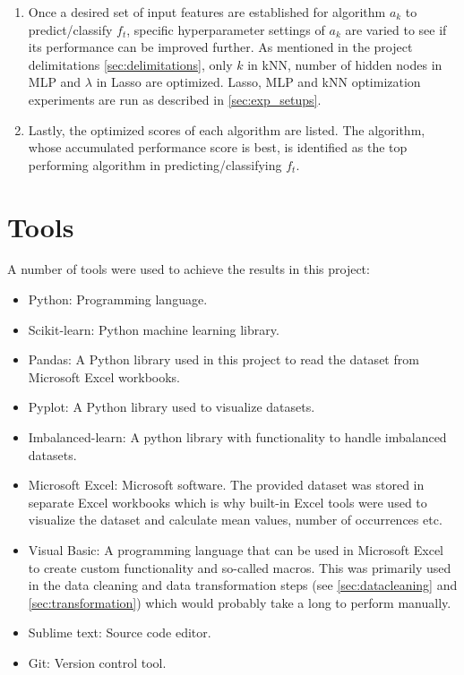 \begin{enumerate}
			\item Once a desired set of input features are established for algorithm $a_k$ to predict/classify $f_t$, specific hyperparameter settings of $a_k$ are varied to see if its performance can be improved further. As mentioned in the project delimitations \ref{sec:delimitations}, only $k$ in kNN, number of hidden nodes in MLP and $\lambda$ in Lasso are optimized. Lasso, MLP and kNN optimization experiments are run as described in \ref{sec:exp_setups}.
			\item Lastly, the optimized scores of each algorithm are listed. The algorithm, whose accumulated performance score is best, is identified as the top performing algorithm in predicting/classifying $f_t$.
		\end{enumerate}
		

\section{Tools}
	A number of tools were used to achieve the results in this project:
	\begin{itemize}
		\item{Python: } Programming language.
		\item{Scikit-learn: } Python machine learning library. 
		\item{Pandas: } A Python library used in this project to read the dataset from Microsoft Excel workbooks.
		\item{Pyplot: } A Python library used to visualize datasets.
		\item{Imbalanced-learn:} A python library with functionality to handle imbalanced datasets.
		\item{Microsoft Excel: } Microsoft software. The provided dataset was stored in separate Excel workbooks which is why built-in Excel tools were used to visualize the dataset and calculate mean values, number of occurrences etc.
		\item{Visual Basic: } A programming language that can be used in Microsoft Excel to create custom functionality and so-called macros. This was primarily used in the data cleaning and data transformation steps (see \ref{sec:datacleaning} and \ref{sec:transformation}) which would probably take a long to perform manually.
		\item{Sublime text: } Source code editor.
		\item{Git: } Version control tool. 
	\end{itemize}



